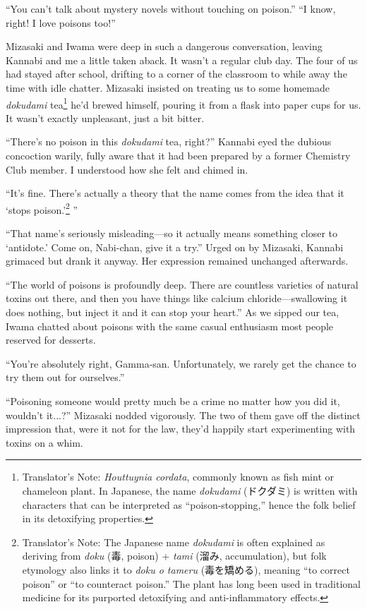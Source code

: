 \documentclass[
    a4paper,
    12pt,
    twoside,
    openany,
    UTF8,
    fontset=windows
]{ctexbook}
\begin{document}
``You can't talk about mystery novels without touching on poison.''
``I know, right! I love poisons too!''

Mizasaki and Iwama were deep in such a dangerous conversation, leaving Kannabi and me a little taken aback.
It wasn't a regular club day. The four of us had stayed after school, drifting to a corner of the classroom to while away the time with idle chatter. Mizasaki insisted on treating us to some homemade \textit{dokudami} tea\footnote{Translator's Note: \textit{Houttuynia cordata}, commonly known as fish mint or chameleon plant. In Japanese, the name \textit{dokudami} (ドクダミ) is written with characters that can be interpreted as ``poison-stopping,'' hence the folk belief in its detoxifying properties.} he'd brewed himself, pouring it from a flask into paper cups for us. It wasn't exactly unpleasant, just a bit bitter.

``There's no poison in this \textit{dokudami} tea, right?''
Kannabi eyed the dubious concoction warily, fully aware that it had been prepared by a former Chemistry Club member. I understood how she felt and chimed in.

``It's fine. There's actually a theory that the name comes from the idea that it `stops poison.'\footnote{Translator's Note: The Japanese name \textit{dokudami} is often explained as deriving from \textit{doku} (毒, poison) + \textit{tami} (溜み, accumulation), but folk etymology also links it to \textit{doku o tameru} (毒を矯める), meaning ``to correct poison'' or ``to counteract poison.'' The plant has long been used in traditional medicine for its purported detoxifying and anti-inflammatory effects.} ''

``That name's seriously misleading---so it actually means something closer to `antidote.' Come on, Nabi-chan, give it a try.''
Urged on by Mizasaki, Kannabi grimaced but drank it anyway. Her expression remained unchanged afterwards.

``The world of poisons is profoundly deep. There are countless varieties of natural toxins out there, and then you have things like calcium chloride---swallowing it does nothing, but inject it and it can stop your heart.''
As we sipped our tea, Iwama chatted about poisons with the same casual enthusiasm most people reserved for desserts.

``You're absolutely right, Gamma-san. Unfortunately, we rarely get the chance to try them out for ourselves.''

``Poisoning someone would pretty much be a crime no matter how you did it, wouldn't it...?''
Mizasaki nodded vigorously. The two of them gave off the distinct impression that, were it not for the law, they'd happily start experimenting with toxins on a whim.
\end{document}
